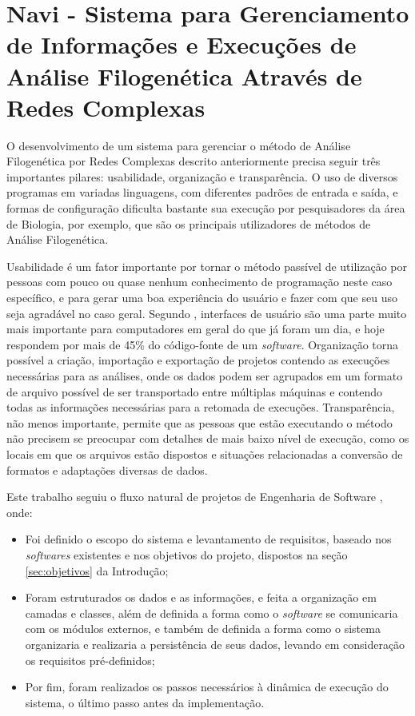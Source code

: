\chapter{Navi - Sistema para Gerenciamento de Informações e Execuções de Análise Filogenética Através de Redes Complexas}
\label{cap:navi}

O desenvolvimento de um sistema para gerenciar o método de Análise Filogenética por Redes Complexas descrito anteriormente precisa seguir três importantes
pilares: usabilidade, organização e transparência. O uso de diversos programas em variadas linguagens, com diferentes padrões de entrada e saída, e formas
de configuração dificulta bastante sua execução por pesquisadores da área de Biologia, por exemplo, que são os principais utilizadores de métodos de Análise
Filogenética.

Usabilidade é um fator importante por tornar o método passível de utilização por pessoas com pouco ou quase nenhum conhecimento de programação neste caso
específico, e para gerar uma boa experiência do usuário e fazer com que seu uso seja agradável no caso geral. Segundo \cite{nielsen1993}, interfaces de
usuário são uma parte muito mais importante para computadores em geral do que já foram um dia, e hoje respondem por mais de 45\% do código-fonte de um
\textit{software}. Organização torna possível a criação, importação e exportação de projetos contendo as execuções necessárias para as análises,
onde os dados podem ser agrupados em um formato de arquivo possível de ser transportado entre múltiplas máquinas e contendo todas as informações
necessárias para a retomada de execuções. Transparência, não menos importante, permite que as pessoas que estão executando o método não precisem se
preocupar com detalhes de mais baixo nível de execução, como os locais em que os arquivos estão dispostos e situações relacionadas a conversão de
formatos e adaptações diversas de dados.

Este trabalho seguiu o fluxo natural de projetos de Engenharia de Software \cite{softeng2005}, onde:

\begin{itemize}
  \item{Foi definido o escopo do sistema e levantamento de requisitos, baseado nos \textit{softwares} existentes e nos objetivos do projeto,
dispostos na seção \ref{sec:objetivos} da Introdução;}
  \item{Foram estruturados os dados e as informações, e feita a organização em camadas e classes, além de definida a forma como o \textit{software}
se comunicaria com os módulos externos, e também de definida a forma como o sistema organizaria e realizaria a persistência de seus dados, levando
em consideração os requisitos pré-definidos;}
  \item{Por fim, foram realizados os passos necessários à dinâmica de execução do sistema, o último passo antes da implementação. }
\end{itemize}

